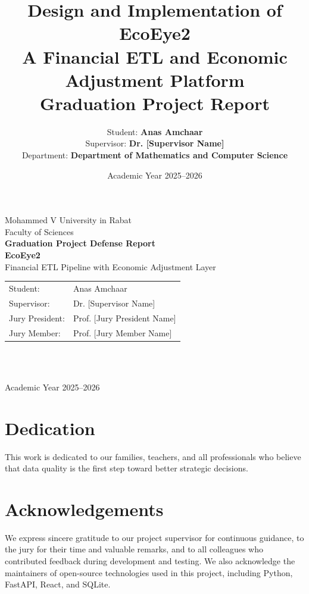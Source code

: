 \documentclass[12pt,a4paper]{report}
\title{
  \Huge\textbf{Design and Implementation of EcoEye2}\\
  \Large A Financial ETL and Economic Adjustment Platform\\[1em]
  \large Graduation Project Report
}
\author{
  Student: \textbf{Anas Amchaar} \\
  Supervisor: \textbf{Dr. [Supervisor Name]} \\
  Department: \textbf{Department of Mathematics and Computer Science}
}
\date{Academic Year 2025--2026}
\begin{document}
\begin{titlepage}
  \centering
  {\Large Mohammed V University in Rabat}\\[0.4cm]
  {\large Faculty of Sciences}\\[1.4cm]
  {\Large\textbf{Graduation Project Defense Report}}\\[1.2cm]
  {\Huge\textbf{EcoEye2}}\\[0.2cm]
  {\Large Financial ETL Pipeline with Economic Adjustment Layer}\\[1.2cm]
  \begin{tabular}{p{}p{}}
    Student: & Anas Amchaar \\
    Supervisor: & Dr. [Supervisor Name] \\
    Jury President: & Prof. [Jury President Name] \\
    Jury Member: & Prof. [Jury Member Name] \\
  \end{tabular}\\[1.5cm]
  \\[1.5cm]
  {\large Academic Year 2025--2026}
\end{titlepage}

\chapter*{Dedication}
This work is dedicated to our families, teachers, and all professionals who believe that data quality is the first step toward better strategic decisions.

\chapter*{Acknowledgements}
We express sincere gratitude to our project supervisor for continuous guidance, to the jury for their time and valuable remarks, and to all colleagues who contributed feedback during development and testing. We also acknowledge the maintainers of open-source technologies used in this project, including Python, FastAPI, React, and SQLite.
\end{document}
